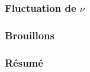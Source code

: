 \subsubsection{Fluctuation de $\nu$}
	
\subsubsection{Brouillons}

\subsubsection{Résumé}





%




	
	
	

	
	
	
	
	
	
